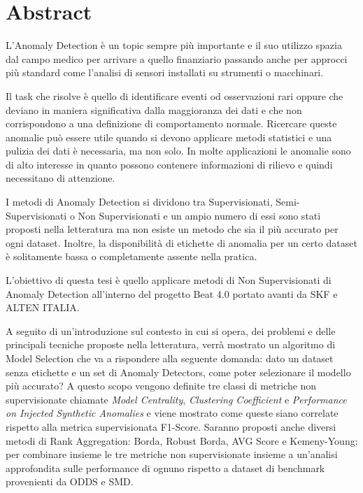 \chapter*{Abstract}
L’Anomaly Detection è un topic sempre più importante e il suo utilizzo spazia dal campo medico per arrivare a quello finanziario passando anche per approcci più standard come l'analisi di sensori installati su strumenti o macchinari.

Il task che risolve è quello di identificare eventi od osservazioni rari oppure che deviano in maniera significativa dalla maggioranza dei dati e che non corrispondono a una definizione di comportamento normale. Ricercare queste anomalie può essere utile quando si devono applicare metodi statistici e una pulizia dei dati è necessaria, ma non solo. In molte applicazioni le anomalie sono di alto interesse in quanto possono contenere informazioni di rilievo e quindi necessitano di attenzione. 

I metodi di Anomaly Detection si dividono tra Supervisionati, Semi-Supervisionati o Non Supervisionati e un ampio numero di essi sono stati proposti nella letteratura ma non esiste un metodo che sia il più accurato per ogni dataset. Inoltre, la disponibilità di etichette di anomalia per un certo dataset è solitamente bassa o completamente assente nella pratica. 


L’obiettivo di questa tesi è quello applicare metodi di Non Supervisionati di Anomaly Detection all'interno del progetto Beat 4.0 portato avanti da SKF e ALTEN ITALIA. 

A seguito di un'introduzione sul contesto in cui si opera, dei problemi e delle principali tecniche proposte nella letteratura, verrà mostrato un algoritmo di Model Selection che va a rispondere alla seguente domanda: dato un dataset senza etichette e un set di Anomaly Detectors, come poter selezionare il modello più accurato? A questo scopo vengono definite tre classi di metriche non supervisionate chiamate \textit{Model Centrality}, \textit{Clustering Coefficient} e \textit{Performance on Injected Synthetic Anomalies} e viene mostrato come queste siano correlate rispetto alla metrica supervisionata F1-Score. Saranno proposti anche diversi metodi di Rank Aggregation: Borda, Robust Borda, AVG Score e Kemeny-Young; per combinare insieme le tre metriche non supervisionate insieme a un'analisi approfondita sulle performance di ognuno rispetto a dataset di benchmark provenienti da ODDS e SMD.

